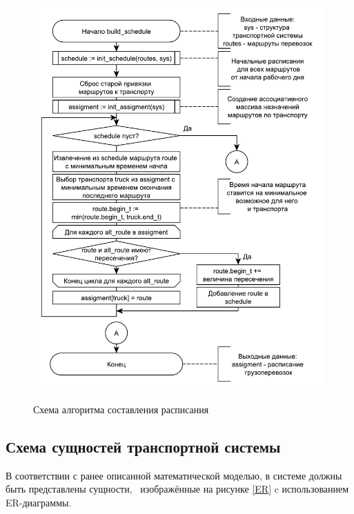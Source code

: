 \begin{figure}[hp]
	\begin{center}
		{\includegraphics[scale=0.95, angle=0, page=1]{img/schedule.pdf}}
		\caption{Схема алгоритма составления расписания}
		\label{alg:schedule}
	\end{center}
\end{figure}

\subsection{Схема сущностей транспортной системы}
В соответствии с ранее описанной математической моделью, в системе должны быть представлены сущности, \, изображённые на рисунке \ref{ER} c использованием ER-диаграммы.

